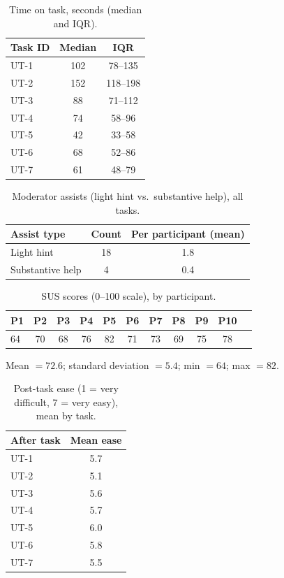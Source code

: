 \begin{table}[htbp]
  \centering
  \caption{Time on task, seconds (median and IQR).}
  \label{tab:times}
  \begin{tabular}{lcc}
    \toprule
    \textbf{Task ID} & \textbf{Median} & \textbf{IQR}\\
    \midrule
    UT-1 & 102 & 78--135\\
    UT-2 & 152 & 118--198\\
    UT-3 & 88 & 71--112\\
    UT-4 & 74 & 58--96\\
    UT-5 & 42 & 33--58\\
    UT-6 & 68 & 52--86\\
    UT-7 & 61 & 48--79\\
    \bottomrule
  \end{tabular}
\end{table}

\begin{table}[htbp]
  \centering
  \caption{Moderator assists (light hint vs.\ substantive help), all tasks.}
  \label{tab:assists}
  \begin{tabular}{lcc}
    \toprule
    \textbf{Assist type} & \textbf{Count} & \textbf{Per participant (mean)}\\
    \midrule
    Light hint & 18 & 1.8\\
    Substantive help & 4 & 0.4\\
    \bottomrule
  \end{tabular}
\end{table}

\begin{table}[htbp]
  \centering
  \caption{SUS scores (0--100 scale), by participant.}
  \label{tab:sus}
  \begin{tabular}{lcccccccccc}
    \toprule
    P1 & P2 & P3 & P4 & P5 & P6 & P7 & P8 & P9 & P10\\
    \midrule
    64 & 70 & 68 & 76 & 82 & 71 & 73 & 69 & 75 & 78\\
    \bottomrule
  \end{tabular}

  \vspace{0.75em}
  \noindent Mean $= 72.6$; standard deviation $= 5.4$; min $= 64$; max $= 82$.
\end{table}

\begin{table}[htbp]
  \centering
  \caption{Post-task ease (1 = very difficult, 7 = very easy), mean by task.}
  \label{tab:ease}
  \begin{tabular}{lc}
    \toprule
    \textbf{After task} & \textbf{Mean ease}\\
    \midrule
    UT-1 & 5.7\\
    UT-2 & 5.1\\
    UT-3 & 5.6\\
    UT-4 & 5.7\\
    UT-5 & 6.0\\
    UT-6 & 5.8\\
    UT-7 & 5.5\\
    \bottomrule
  \end{tabular}
\end{table}

